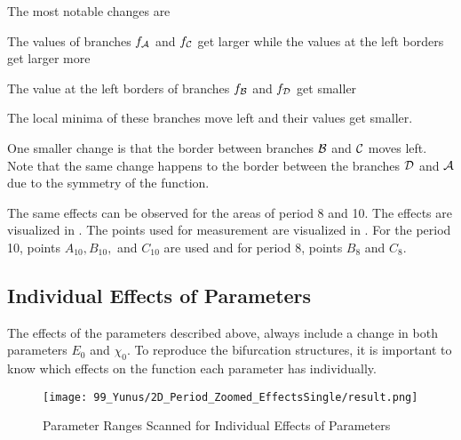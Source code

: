 The most notable changes are
\begin{enumerate*}
	\item The values of branches $f_{\mathcal{A}}$ and $f_{\mathcal{C}}$ get larger while the values at the left borders get larger more
	\item The value at the left borders of branches $f_{\mathcal{B}}$ and $f_{\mathcal{D}}$ get smaller
	\item The local minima of these branches move left and their values get smaller.
\end{enumerate*}
One smaller change is that the border between branches $\mathcal{B}$ and $\mathcal{C}$ moves left.
Note that the same change happens to the border between the branches $\mathcal{D}$ and $\mathcal{A}$ due to the symmetry of the function.

The same effects can be observed for the areas of period 8 and 10.
The effects are visualized in .
The points used for measurement are visualized in .
For the period 10, points $A_{10}, B_{10},$ and $C_{10}$ are used and for period 8, points $B_8$ and $C_8$.

\subsection{Individual Effects of Parameters}
\label{sec:yunus.param.effects.individual}

The effects of the parameters described above, always include a change in both parameters $E_0$ and $\chi_0$.
To reproduce the bifurcation structures, it is important to know which effects on the function each parameter has individually.

\begin{figure}
	\centering
	\texttt{[image: 99\_Yunus/2D\_Period\_Zoomed\_EffectsSingle/result.png]}
	\caption{Parameter Ranges Scanned for Individual Effects of Parameters}
	\label{fig:yunus.function.evolution.single.map}
\end{figure}

